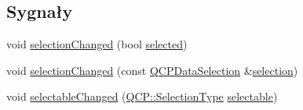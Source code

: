 \subsection*{Sygnały}
\begin{DoxyCompactItemize}
\item 
void \hyperlink{class_q_c_p_abstract_plottable_a3af66432b1dca93b28e00e78a8c7c1d9}{selection\+Changed} (bool \hyperlink{class_q_c_p_abstract_plottable_ab901903adcb0e29467d63de72340ab29}{selected})
\item 
void \hyperlink{class_q_c_p_abstract_plottable_a787a9c39421059006891744b731fa473}{selection\+Changed} (const \hyperlink{class_q_c_p_data_selection}{Q\+C\+P\+Data\+Selection} \&\hyperlink{class_q_c_p_abstract_plottable_a6fcea502826afbaab2568bd3ebc61b4b}{selection})
\item 
void \hyperlink{class_q_c_p_abstract_plottable_a663b1a44123c8340ac041a29d1e2c973}{selectable\+Changed} (\hyperlink{namespace_q_c_p_ac6cb9db26a564b27feda362a438db038}{Q\+C\+P\+::\+Selection\+Type} \hyperlink{class_q_c_p_abstract_plottable_a9369b0da736b88dea0ee6b7345f8ea74}{selectable})
\end{DoxyCompactItemize}
